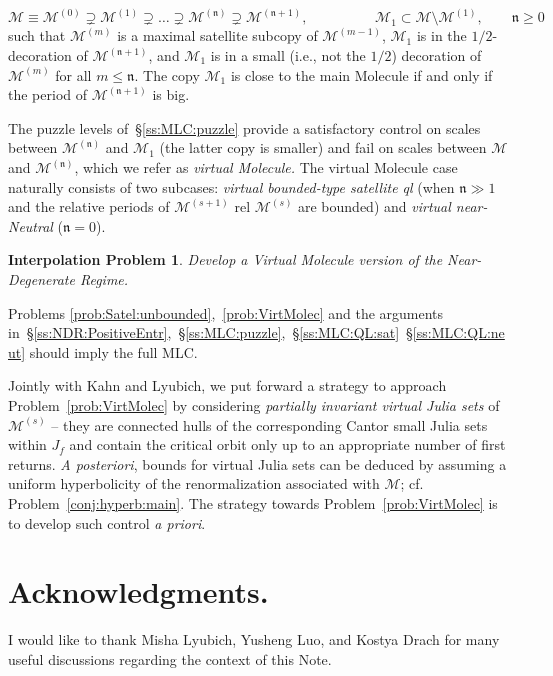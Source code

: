 \documentclass[twoside,leqno]{article}
\theoremstyle{plain}
\newtheorem{Interprob}[thm]{Interpolation Problem}
\newcommand\MM{{\mathcal{M}}}
\newcommand\Jul{J}
\newcommand{\nn}{\mathfrak{n}}
\begin{document}
\[\MM\equiv \MM^{(0)} \supsetneq \MM^{(1)}\supsetneq \dots \supsetneq \MM^{(\nn)} \supsetneq \MM^{(\nn+1)},\hspace{2cm} \MM_1\subset \MM\setminus \MM^{(1)}, \qquad \nn\ge 0
\]
such that $\MM^{(m)}$ is a maximal satellite subcopy of $\MM^{(m-1)}$, $\MM_1$ is in the $1/2$-decoration of $\MM^{(\nn+1)}$, and $\MM_1$ is in a small (i.e., not the $1/2$) decoration of $\MM^{(m)}$ for all $m\le \nn$. The copy $\MM_1$ is close to the main Molecule if and only if the period of $\MM^{(\nn+1)}$ is big.

The puzzle levels of~\S\ref{ss:MLC:puzzle} provide a satisfactory control on scales between $\MM^{(\nn)}$ and $\MM_1$ (the latter copy is smaller) and fail on scales between $\MM$ and $\MM^{(\nn)}$, which we refer as \emph{virtual Molecule.} The virtual Molecule case naturally consists of two subcases: \emph{virtual bounded-type satellite ql} (when $\nn\gg 1$ and the relative periods of $\MM^{(s+1)}$ rel $\MM^{(s)}$ are bounded) and \emph{virtual near-Neutral} ($\nn=0$).



\begin{Interprob}\label{prob:Interp}
\label{prob:VirtMolec}
Develop a Virtual Molecule version of the Near-Degenerate Regime.
\end{Interprob}
Problems \ref{prob:Satel:unbounded},~\ref{prob:VirtMolec} and the arguments in~\S\ref{ss:NDR:PositiveEntr},~\S\ref{ss:MLC:puzzle},~\S\ref{ss:MLC:QL:sat}~\S\ref{ss:MLC:QL:neut} should imply the full MLC. 


Jointly with Kahn and Lyubich, we put forward a strategy to approach Problem~\ref{prob:VirtMolec} by considering \emph{partially invariant virtual Julia sets} of $\MM^{(s)}$ -- they are connected hulls of the corresponding Cantor small Julia sets within $\Jul_f$ and contain the critical orbit only up to an appropriate number of first returns. \emph{A posteriori}, bounds for virtual Julia sets can be deduced by assuming a uniform hyperbolicity of the renormalization associated with $\MM$; cf. Problem~\ref{conj:hyperb:main}. The strategy towards Problem~\ref{prob:VirtMolec} is to develop such control \emph{a priori}.







\section*{Acknowledgments.} I would like to thank Misha Lyubich, Yusheng Luo, and Kostya Drach for many useful discussions regarding the context of this Note.
\end{document}
